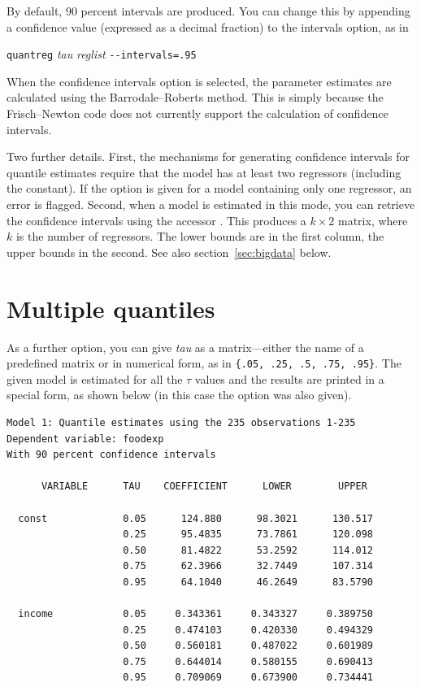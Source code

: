 By default, 90 percent intervals are produced.  You can change this by
appending a confidence value (expressed as a decimal fraction) to the
intervals option, as in

\vspace{1em}
\noindent
\qquad \texttt{quantreg} \textsl{tau} \textsl{reglist} \verb|--intervals=.95|
\vspace{1em}

When the confidence intervals option is selected, the parameter
estimates are calculated using the Barrodale--Roberts method.  This is
simply because the Frisch--Newton code does not currently support the
calculation of confidence intervals.

Two further details.  First, the mechanisms for generating confidence
intervals for quantile estimates require that the model has at least
two regressors (including the constant).  If the 
option is given for a model containing only one regressor, an error is
flagged.  Second, when a model is estimated in this mode, you can
retrieve the confidence intervals using the accessor .
This produces a $k \times 2$ matrix, where $k$ is the number of
regressors.  The lower bounds are in the first column, the upper
bounds in the second.  See also section~\ref{sec:bigdata} below.

\section{Multiple quantiles}

As a further option, you can give \textsl{tau} as a matrix---either
the name of a predefined matrix or in numerical form, as in
\verb+{.05, .25, .5, .75, .95}+.  The given model is estimated for all
the $\tau$ values and the results are printed in a special form, as
shown below (in this case the  option was also
given).

{\small
\begin{verbatim}
Model 1: Quantile estimates using the 235 observations 1-235
Dependent variable: foodexp
With 90 percent confidence intervals

      VARIABLE      TAU    COEFFICIENT      LOWER        UPPER

  const             0.05      124.880      98.3021      130.517
                    0.25      95.4835      73.7861      120.098
                    0.50      81.4822      53.2592      114.012
                    0.75      62.3966      32.7449      107.314
                    0.95      64.1040      46.2649      83.5790

  income            0.05     0.343361     0.343327     0.389750
                    0.25     0.474103     0.420330     0.494329
                    0.50     0.560181     0.487022     0.601989
                    0.75     0.644014     0.580155     0.690413
                    0.95     0.709069     0.673900     0.734441
\end{verbatim}
}

